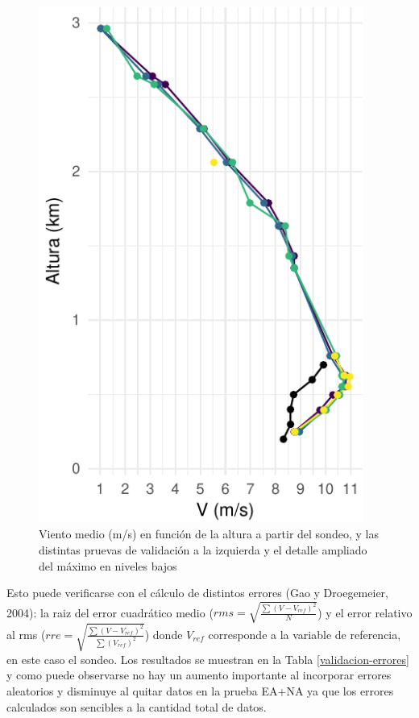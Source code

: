 \documentclass[12pt,spanish,oneside]{book}
\begin{document}
\begin{figure}
\includegraphics[width=0.95\textwidth, ]{Tesis_files/figure-latex/validacion-perfiles-1} \caption{Viento medio (m/s) en función de la altura a partir del sondeo, y las distintas pruevas de validación a la izquierda y el detalle ampliado del máximo en niveles bajos \label{validacion-perfiles}}\label{fig:validacion-perfiles}
\end{figure}

Esto puede verificarse con el cálculo de distintos errores (Gao y
Droegemeier, 2004): la raiz del error cuadrático medio
(\(rms = \sqrt{ \frac{\sum (V-V_{ref})^2}{N} }\)) y el error relativo al
rms (\(rre = \sqrt{ \frac{\sum (V-V_{ref})^2}{\sum (V_{ref})^2} }\))
donde \(V_{ref}\) corresponde a la variable de referencia, en este caso
el sondeo. Los resultados se muestran en la Tabla
\ref{validacion-errores} y como puede observarse no hay un aumento
importante al incorporar errores aleatorios y disminuye al quitar datos
en la prueba EA+NA ya que los errores calculados son sencibles a la
cantidad total de datos.
\end{document}
